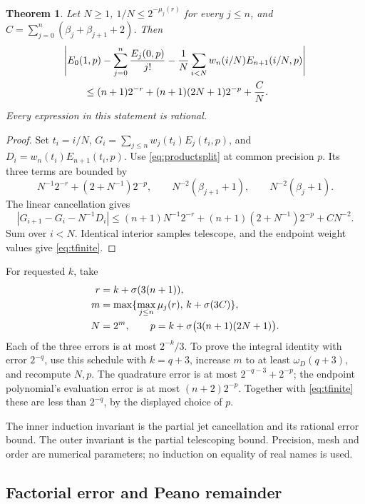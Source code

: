 \documentclass[11pt]{article}
\newtheorem{theorem}{Theorem}[section]
\theoremstyle{definition}
\begin{document}
\begin{theorem}\label{thm:finiteTaylor}
Let \(N\ge1\), \(1/N\le2^{-\mu_j(r)}\) for every \(j\le n\), and
\(C=\sum_{j=0}^{n}(\beta_j+\beta_{j+1}+2)\). Then
\begin{align}
 &\Bigg|E_0(1,p)-\sum_{j=0}^{n}\frac{E_j(0,p)}{j!}
 -\frac1N\sum_{i<N}w_n(i/N)E_{n+1}(i/N,p)\Bigg|\notag\\
 &\qquad\le(n+1)2^{-r}+(n+1)(2N+1)2^{-p}+\frac CN.\label{eq:tfinite}
\end{align}
Every expression in this statement is rational.
\end{theorem}
\begin{proof}
Set \(t_i=i/N\),
\(G_i=\sum_{j\le n}w_j(t_i)E_j(t_i,p)\), and
\(D_i=w_n(t_i)E_{n+1}(t_i,p)\).
Use \eqref{eq:productsplit} at common precision \(p\).
Its three terms are bounded by
\[
 N^{-1}2^{-r}+(2+N^{-1})2^{-p},\qquad
 N^{-2}(\beta_{j+1}+1),\qquad N^{-2}(\beta_j+1).
\]
The linear cancellation gives
\[
 |G_{i+1}-G_i-N^{-1}D_i|
 \le(n+1)N^{-1}2^{-r}+(n+1)(2+N^{-1})2^{-p}+CN^{-2}.
\]
Sum over \(i<N\). Identical interior samples telescope, and the endpoint
weight values give \eqref{eq:tfinite}.
\end{proof}

For requested \(k\), take
\begin{align}
 r&=k+\sigma(3(n+1)),\notag\\
 m&=\max\{\max_{j\le n}\mu_j(r),\,k+\sigma(3C)\},\notag\\
 N&=2^m,\qquad
 p=k+\sigma\bigl(3(n+1)(2N+1)\bigr).\label{eq:tschedule}
\end{align}
Each of the three errors is at most \(2^{-k}/3\).
To prove the integral identity with error \(2^{-q}\), use this schedule
with \(k=q+3\), increase \(m\) to at least \(\omega_D(q+3)\), and
recompute \(N,p\). The quadrature error is at most
\(2^{-q-3}+2^{-p}\); the endpoint polynomial's evaluation error is at most
\((n+2)2^{-p}\). Together with \eqref{eq:tfinite} these are less than
\(2^{-q}\), by the displayed choice of \(p\).

The inner induction invariant is the partial jet cancellation and its
rational error bound. The outer invariant is the partial telescoping
bound. Precision, mesh and order are numerical parameters; no induction
on equality of real names is used.

\subsection{Factorial error and Peano remainder}
\end{document}
